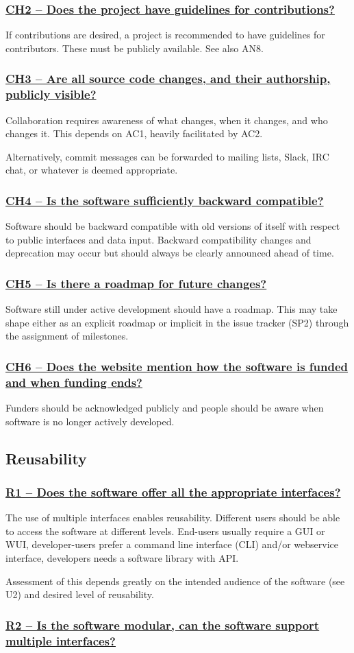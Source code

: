 \documentclass[a4paper,11pt]{article}
\newcommand{\indicator}[1]{\subsubsection*{\underline{#1}}}
\begin{document}
\indicator{CH2 -- Does the project have guidelines for contributions?}

If contributions are desired, a project is recommended to have guidelines for
contributors. These must be publicly available.
See also AN8.

\indicator{CH3 -- Are all source code changes, and their authorship, publicly visible?} 

Collaboration requires awareness of what changes, when it changes, and who
changes it. This depends on AC1, heavily facilitated by AC2.

Alternatively, commit messages can be forwarded to mailing lists, Slack, IRC chat, or
whatever is deemed appropriate.

\indicator{CH4 -- Is the software sufficiently backward compatible?}

Software should be backward compatible with old versions of itself with respect
to public interfaces and data input. Backward compatibility changes and
deprecation may occur but should always be clearly announced ahead of time.

\indicator{CH5 -- Is there a roadmap for future changes?}

Software still under active development should have a roadmap. This may take
shape either as an explicit roadmap or implicit in the issue tracker
(SP2) through the assignment of milestones.

\indicator{CH6 -- Does the website mention how the software is funded and
when funding ends?}

Funders should be acknowledged publicly and people should be aware when
software is no longer actively developed.

\subsection{Reusability}

\indicator{R1 -- Does the software offer all the appropriate interfaces?}

The use of multiple interfaces enables reusability. Different users should be
able to access the software at different levels. End-users usually require a
GUI or WUI, developer-users prefer a command line interface (CLI) and/or
webservice interface, developers needs a software library with API.

Assessment of this depends greatly on the intended audience of the software
(see U2) and desired level of reusability.

\indicator{R2 -- Is the software modular, can the software support multiple interfaces?}
\end{document}
